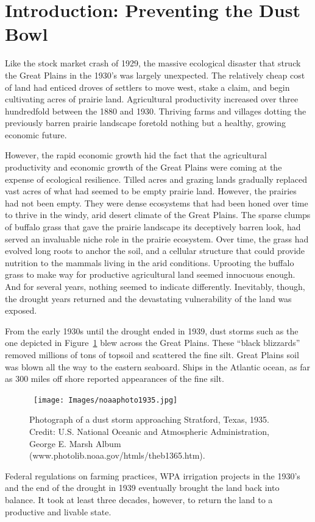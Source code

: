 \documentclass{article}
\begin{document}
\section{Introduction: Preventing the Dust Bowl}

Like the stock market crash of 1929, the massive ecological disaster 
that struck the Great Plains in the 1930's was largely unexpected.
The relatively cheap cost of land had enticed 
droves of settlers to move west, stake a claim,
and begin cultivating  acres of  prairie land. 
Agricultural productivity increased
over three hundredfold between the 1880
and 1930. Thriving farms and villages dotting the
previously barren prairie landscape foretold nothing
but a healthy, growing economic future.

However,  the rapid economic growth hid the fact that the
agricultural productivity and economic growth
of the Great Plains were coming at the expense of ecological 
resilience. Tilled acres and grazing lands gradually replaced
vast acres of what had seemed to be empty prairie land. 
However, the prairies had not been empty. They were dense ecosystems that had
been honed over time to thrive in the windy, arid desert climate of the
Great Plains. The sparse clumps 
of buffalo grass that gave the prairie landscape its 
deceptively barren look, had served an invaluable niche
role
in the prairie ecosystem. Over time, the grass had
evolved long roots to anchor the soil, and a 
cellular structure that could provide nutrition to the
mammals living in the arid conditions. Uprooting
the buffalo grass to make way for productive agricultural land 
seemed innocuous enough. And for several years, nothing seemed
to indicate differently. Inevitably, though, the drought years
returned and the devastating vulnerability
of the land was
exposed. 

From the early 1930s until the drought ended in 1939,
dust storms such as the one depicted
in Figure~\ref{fig:dust}  blew across the Great Plains. 
These ``black blizzards'' removed millions of tons
of topsoil and scattered the fine silt. 
Great Plains soil was blown all the way to the eastern seaboard.
Ships in the Atlantic ocean, as far as 300 miles off shore
reported appearances of the fine silt.~\citep{kassass_drought_1987}

\citet{kassass_drought_1987}
\citet[p. 36]{kassass_drought_1987}


\begin{figure}[H]
\centering\
\texttt{[image: Images/noaaphoto1935.jpg]}
\caption{Photograph of a dust storm approaching Stratford, Texas, 1935. Credit: U.S. 
National Oceanic and Atmospheric Administration, George E. Marsh Album
(www.photolib.noaa.gov/htmls/theb1365.htm).
}
\label{fig:dust}
\end{figure}
Federal regulations on farming practices, WPA irrigation projects in the 1930's
and the end of the drought in 1939 eventually brought the
land back into balance. It took at least three decades,
however, to
return the land to a productive and livable state. 
\end{document}
